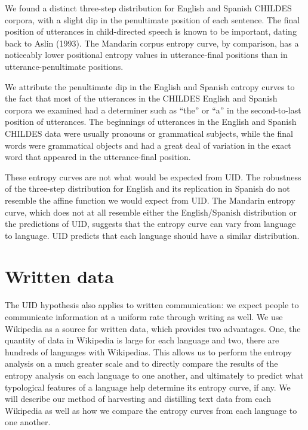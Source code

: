 \documentclass[10pt, letterpaper]{article}
\begin{document}
We found a distinct three-step distribution for English and Spanish
CHILDES corpora, with a slight dip in the penultimate position of each
sentence. The final position of utterances in child-directed speech is
known to be important, dating back to Aslin (1993). The Mandarin corpus
entropy curve, by comparison, has a noticeably lower positional entropy
values in utterance-final positions than in utterance-penultimate
positions.

We attribute the penultimate dip in the English and Spanish entropy
curves to the fact that most of the utterances in the CHILDES English
and Spanish corpora we examined had a determiner such as ``the'' or
``a'' in the second-to-last position of utterances. The beginnings of
utterances in the English and Spanish CHILDES data were usually pronouns
or grammatical subjects, while the final words were grammatical objects
and had a great deal of variation in the exact word that appeared in the
utterance-final position.

These entropy curves are not what would be expected from UID. The
robustness of the three-step distribution for English and its
replication in Spanish do not resemble the affine function we would
expect from UID. The Mandarin entropy curve, which does not at all
resemble either the English/Spanish distribution or the predictions of
UID, suggests that the entropy curve can vary from language to language.
UID predicts that each language should have a similar distribution.

\section{Written data}\label{written-data}

The UID hypothesis also applies to written communication: we expect
people to communicate information at a uniform rate through writing as
well. We use Wikipedia as a source for written data, which provides two
advantages. One, the quantity of data in Wikipedia is large for each
language and two, there are hundreds of languages with Wikipedias. This
allows us to perform the entropy analysis on a much greater scale and to
directly compare the results of the entropy analysis on each language to
one another, and ultimately to predict what typological features of a
language help determine its entropy curve, if any. We will describe our
method of harvesting and distilling text data from each Wikipedia as
well as how we compare the entropy curves from each language to one
another.
\end{document}
